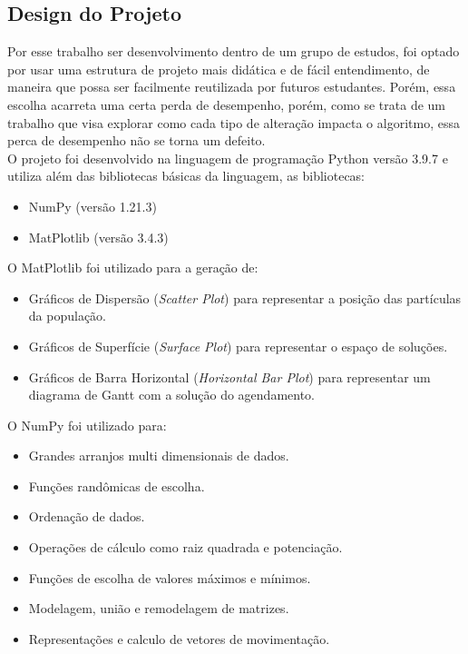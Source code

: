 \subsection{Design do Projeto}
Por esse trabalho ser desenvolvimento dentro de um grupo de estudos, foi optado por usar uma estrutura de projeto mais didática e de fácil entendimento, de maneira que possa ser facilmente reutilizada por futuros estudantes. Porém, essa escolha acarreta uma certa perda de desempenho, porém, como se trata de um trabalho que visa explorar como cada tipo de alteração impacta o algoritmo, essa perca de desempenho não se torna um defeito.\\
\indent O projeto foi desenvolvido na linguagem de programação Python versão 3.9.7 e utiliza além das bibliotecas básicas da linguagem, as bibliotecas:
\begin{itemize}
    \item NumPy (versão 1.21.3)
    \item MatPlotlib (versão 3.4.3)
\end{itemize}

\noindent O MatPlotlib foi utilizado para a geração de: 
\begin{itemize}
    \item Gráficos de Dispersão (\textit{Scatter Plot}) para representar a posição das partículas da população.
    \item Gráficos de Superfície (\textit{Surface Plot}) para representar o espaço de soluções.
    \item Gráficos de Barra Horizontal (\textit{Horizontal Bar Plot}) para representar um diagrama de Gantt com a solução do agendamento.
\end{itemize}

\noindent O NumPy foi utilizado para: 
\begin{itemize}
    \item Grandes arranjos multi dimensionais de dados. 
    \item Funções randômicas de escolha.
    \item Ordenação de dados.
    \item Operações de cálculo como raiz quadrada e potenciação.
    \item Funções de escolha de valores máximos e mínimos.
    \item Modelagem, união e remodelagem de matrizes.
    \item Representações e calculo de vetores de movimentação.
\end{itemize}
        

